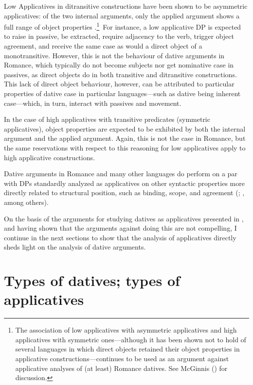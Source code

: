 \documentclass[output=paper,colorlinks,citecolor=brown,nonflat]{./langscibook}
\begin{document}
Low Applicatives in ditransitive constructions have been shown to be asymmetric applicatives:  of the two internal arguments, only the applied argument shows a full range of object properties \citep[203]{Pylkkänen2000}.\footnote{The association of low applicatives with asymmetric applicatives and high applicatives with symmetric ones—although it has been shown not to hold of several languages in which direct objects retained their object properties in applicative constructions—continues to be used as an argument against applicative analyses of (at least) Romance datives. See McGinnis (\citeyear{McGinnis2004,McGinnis2008}) for discussion.}~For instance, a low applicative DP is expected to raise in passive, be extracted, require adjacency to the verb, trigger object agreement, and receive the same case as would a direct object of a monotransitive. However, this is not the behaviour of dative arguments in Romance, which typically do not become subjects nor get nominative case in passives, as direct objects do in both transitive and ditransitive constructions. This lack of direct object behaviour, however, can be attributed to particular properties of dative case in particular languages—such as dative being inherent case—which, in turn, interact with passives and movement.

In the case of high applicatives with transitive predicates (symmetric applicatives), object properties are expected to be exhibited by both the internal argument and the applied argument. Again, this is not the case in Romance, but the same reservations with respect to this reasoning for low applicatives apply to high applicative constructions.

Dative arguments in Romance and many other languages do perform on a par with DPs standardly analyzed as applicatives on other syntactic properties more directly related to structural position, such as  binding, scope, and agreement (; \citealt{BonehNash2017, Bruening2010Ditrans, Cuervo2003, Demonte1995, Pineda2016}, among others).

On the basis of the arguments for studying datives as applicatives presented in , and having shown that the arguments against doing this are not compelling, I continue in the next sections to show that the analysis of applicatives directly sheds light on the analysis of dative arguments.

\section{Types of datives; types of applicatives}\label{sec:cuervo:3}
\end{document}
